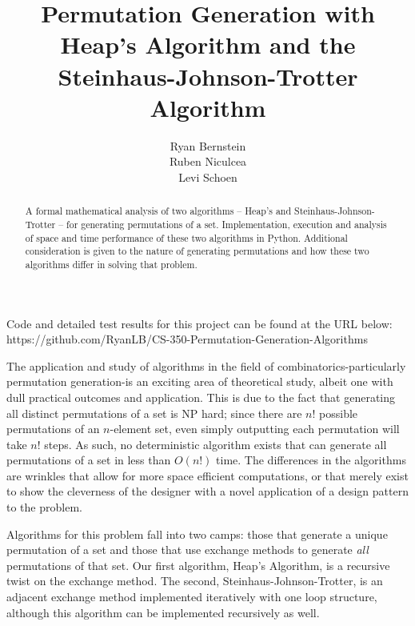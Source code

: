 \documentclass[10pt, oneside]{article}   	%
\title{Permutation Generation with Heap's Algorithm and the Steinhaus-Johnson-Trotter Algorithm}
\author{Ryan Bernstein \\ Ruben Niculcea \\ Levi Schoen}
\date{}							%
\begin{document}
\maketitle
\thispagestyle{empty}

\begin{abstract}
A formal mathematical analysis of two algorithms -- Heap's and Steinhaus-Johnson-Trotter -- for generating permutations of a set. Implementation, execution and analysis of space and time performance of these two algorithms in Python. Additional consideration is given to the nature of generating permutations and how these two algorithms differ in solving that problem.
\end{abstract}

\vspace{2in}

\begin{center}
Code and detailed test results for this project can be found at the URL below:\\
https://github.com/RyanLB/CS-350-Permutation-Generation-Algorithms
\end{center}

\newpage

\tableofcontents
\thispagestyle{empty}
\newpage

\setcounter{page}{1}

The application and study of algorithms in the field of combinatorics-particularly permutation generation-is an exciting area of theoretical study, albeit one with dull practical outcomes and application. This is due to the fact that generating all distinct permutations of a set is NP hard; since there are $n!$ possible permutations of an $n$-element set, even simply outputting each permutation will take $n!$ steps. As such, no deterministic algorithm exists that can generate all permutations of a set in less than $O(n!)$ time. The differences in the algorithms are wrinkles that allow for more space efficient computations, or that merely exist to show the cleverness of the designer with a novel application of a design pattern to the problem.

Algorithms for this problem fall into two camps: those that generate a unique permutation of a set and those that use exchange methods to generate \emph{all} permutations of that set. Our first algorithm, Heap's Algorithm, is a recursive twist on the exchange method. The second, Steinhaus-Johnson-Trotter, is an adjacent exchange method implemented iteratively with one loop structure, although this algorithm can be implemented recursively as well.
\end{document}

